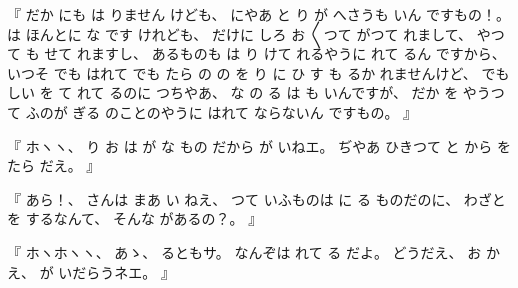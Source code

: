 %
『
だか
にも
は
りません
けども、
%
にやあ
と
り
が
へさうも
いん
ですもの！。
%
は
ほんとに
な
です
けれども、
%
だけに
しろ
お
〳〵つて
がつて
れまして、
%
%
やつて
も
せて
れますし、
%
あるものも
は
り
けて
れるやうに
れて
るん
ですから、
%
いつそ
でも
はれて
でも
たら
の
の
を
り
に
ひ
す
も
るか
れませんけど、
%
でも
しい
を
て
れて
るのに
つちやあ、
%
な
の
る
は
も
いんですが、
%
だか
を
やうつて
ふのが
ぎる
のことのやうに
はれて
ならないん
ですもの。
』

%
『
ホヽヽ、
%
り
お
は
が
な
もの
だから
が
いねエ。
%
ぢやあ
ひきつて
と
から
を
たら
だえ。
』

%
『
あら！、
%
さんは
まあ
い
ねえ、
%
つて
いふものは
に
る
ものだのに、
%
わざと
を
するなんて、
%
そんな
があるの？。
』

%
『
ホヽホヽヽ、
%
あゝ、
%
るともサ。
%
なんぞは
れて
る
だよ。%
%
どうだえ、
%
お
かえ、
%
が
いだらうネエ。
』

